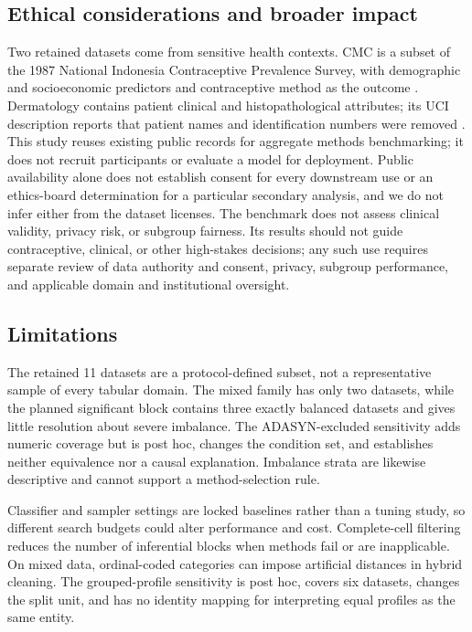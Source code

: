 \documentclass[10pt]{article}
\begin{document}
\subsection{Ethical considerations and broader impact}

Two retained datasets come from sensitive health contexts. CMC is a subset of the 1987 National Indonesia Contraceptive Prevalence Survey, with demographic and socioeconomic predictors and contraceptive method as the outcome \citep{lim1999contraceptive}. Dermatology contains patient clinical and histopathological attributes; its UCI description reports that patient names and identification numbers were removed \citep{ilter1998dermatology}. This study reuses existing public records for aggregate methods benchmarking; it does not recruit participants or evaluate a model for deployment. Public availability alone does not establish consent for every downstream use or an ethics-board determination for a particular secondary analysis, and we do not infer either from the dataset licenses. The benchmark does not assess clinical validity, privacy risk, or subgroup fairness. Its results should not guide contraceptive, clinical, or other high-stakes decisions; any such use requires separate review of data authority and consent, privacy, subgroup performance, and applicable domain and institutional oversight.

\subsection{Limitations}

The retained 11 datasets are a protocol-defined subset, not a representative sample of every tabular domain. The mixed family has only two datasets, while the planned significant block contains three exactly balanced datasets and gives little resolution about severe imbalance. The ADASYN-excluded sensitivity adds numeric coverage but is post hoc, changes the condition set, and establishes neither equivalence nor a causal explanation. Imbalance strata are likewise descriptive and cannot support a method-selection rule.

Classifier and sampler settings are locked baselines rather than a tuning study, so different search budgets could alter performance and cost. Complete-cell filtering reduces the number of inferential blocks when methods fail or are inapplicable. On mixed data, ordinal-coded categories can impose artificial distances in hybrid cleaning. The grouped-profile sensitivity is post hoc, covers six datasets, changes the split unit, and has no identity mapping for interpreting equal profiles as the same entity.
\end{document}
